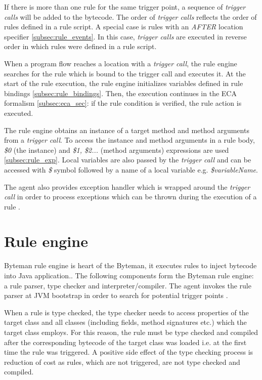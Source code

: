 \documentclass[12pt,oneside]{fithesis2}
\begin{document}
If there is more than one rule for the same trigger point, a sequence of \textit{trigger calls} will be added to the bytecode. The order of \textit{trigger calls} reflects the order of rules defined in a rule script. A special case is rules with an \textit{AFTER} location specifier \ref{subsec:rule_events}. In this case, \textit{trigger calls} are executed in reverse order in which rules were defined in a rule script.

When a program flow reaches a location with a \textit{trigger call}, the rule engine searches for the rule which is bound to the trigger call and executes it. At the start of the rule execution, the rule engine initializes variables defined in rule bindings \ref{subsec:rule_bindings}. Then, the execution continues in the ECA formalism \ref{subsec:eca_sec}: if the rule condition is verified, the rule action is executed.

The rule engine obtains an instance of a target method and method arguments from a \textit{trigger call}. To access the instance and method arguments in a rule body, \textit{\$0} (the instance) and \textit{\$1, \$2...} (method arguments) expressions are used \ref{subsec:rule_exp}. Local variables are also passed by the \textit{trigger call} and can be accessed with \textit{\$} symbol followed by a name of a local variable e.g. \textit{\$variableName}.

The agent also provides exception handler which is wrapped around the \textit{trigger call} in order to process exceptions which can be thrown during the execution of a rule \cite[Agent Transformation]{byteman_doc}.

\section{Rule engine}
\label{sec:rule_engine}
Byteman rule engine is heart of the Byteman, it executes rules to inject bytecode into Java application.. The following components form the Byteman rule engine: a rule parser, type checker and interpreter/compiler. The agent invokes the rule parser at JVM bootstrap in order to search for potential trigger points \cite[ECA Rule Engine]{byteman_doc}.

When a rule is type checked, the type checker needs to access properties of the target class and all classes (including fields, method signatures etc.) which the target class employs. For this reason, the rule must be type checked and compiled after the corresponding bytecode of the target class was loaded i.e. at the first time the rule was triggered. A positive side effect of the type checking process is reduction of cost as rules, which are not triggered, are not type checked and compiled.
\end{document}
